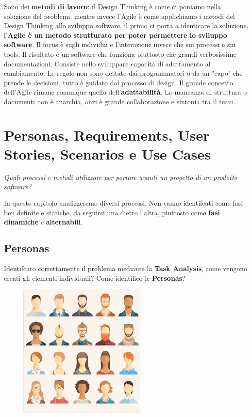 \documentclass[a4paper,11pt,oneside]{book}
\begin{document}
Sono dei \textbf{metodi di lavoro}: il Design Thinking è come ci poniamo nella soluzione del problemi, mentre invece l'Agile è come applichiamo i metodi del Design Thinking allo sviluppo software, il primo ci
porta a identicare la soluzione, l'\textbf{Agile è un metodo strutturato per poter permettere lo sviluppo software}.
Il focus è sugli individui e l'interazione invece che sui processi e sui tools. Il risultato è un software che funziona piuttosto che grandi verbosissime documentazioni. Consiste nello sviluppare capacità di adattamento al cambiamento.
Le regole non sono dettate dai programmatori o da un "capo" che prende le decisioni,
tutto è guidato dal processo di design. Il grande concetto dell'Agile rimane comunque quello dell'\textbf{adattabilità}. La mancanza di struttura o documenti non è anarchia, anzi è grande collaborazione e sintonia tra il team.

\pagebreak

\chapter{Personas, Requirements, User Stories, Scenarios e Use Cases}
\begin{flushleft}
	\textit{Quali processi e metodi utilizzare per portare avanti un progetto di un
		prodotto software?}
\end{flushleft}

In questo capitolo analizzeremo diversi processi.
Non vanno identifcati come fasi ben definite e statiche, da seguirsi una dietro l'altra, piuttosto come \textbf{fasi} \textbf{dinamiche} e \textbf{alternabili}.

\section{Personas}
Identifcato correttamente il problema mediante la \textbf{Task Analysis}, come vengono creati gli elementi individuali? Come identifico le \textbf{Personas}?

\begin{figure}[!h]
	\centering
	\includegraphics[scale=0.55]{immagini/Personas.png}
\end{figure}
\end{document}
